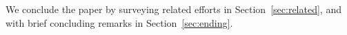 We conclude the paper by surveying related efforts in
Section~\ref{sec:related}, and with brief concluding remarks in
Section~\ref{sec:ending}.





